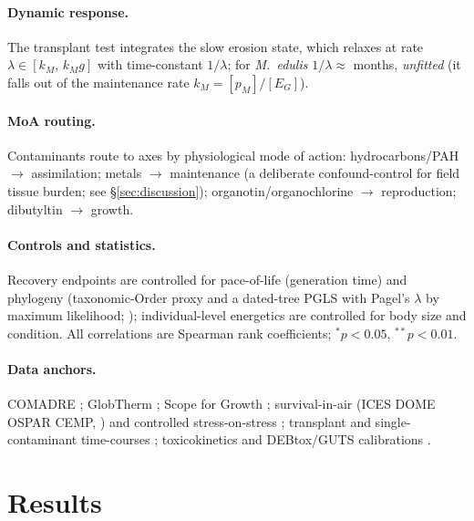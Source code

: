 \paragraph{Dynamic response.} The transplant test integrates the slow erosion state, which relaxes at
rate $\lambda\in[k_M,\,k_M g]$ with time-constant $1/\lambda$; for \emph{M.\ edulis}
$1/\lambda\approx$ months, \emph{unfitted} (it falls out of the maintenance rate $k_M=[p_M]/[E_G]$).

\paragraph{MoA routing.} Contaminants route to axes by physiological mode of action: hydrocarbons/PAH
$\to$ assimilation; metals $\to$ maintenance (a deliberate confound-control for field tissue burden;
see \S\ref{sec:discussion}); organotin/organochlorine $\to$ reproduction; dibutyltin $\to$ growth.

\paragraph{Controls and statistics.} Recovery endpoints are controlled for pace-of-life (generation
time) and phylogeny (taxonomic-Order proxy and a dated-tree PGLS with Pagel's $\lambda$ by maximum
likelihood; \citealp{pagel1999lambda}); individual-level energetics are controlled for body size and
condition. All correlations are Spearman rank coefficients; $^{*}p<0.05$, $^{**}p<0.01$.

\paragraph{Data anchors.} COMADRE \citep{salguero2016comadre}; GlobTherm \citep{bennett2018globtherm};
Scope for Growth \citep{widdows1995sfg,widdows2002sfg,albentosa2012sfg}; survival-in-air (ICES DOME
OSPAR CEMP, \citealp{icesdome2024}) and controlled stress-on-stress \citep{viarengo1995sos};
transplant and single-contaminant time-courses \citep{veldhuizen1991transplant,veldhuizen1991single};
toxicokinetics \citep{rubach2010tk} and DEBtox/GUTS calibrations
\citep{nyman2012guts,ashauer2016modelling,baas2015metabolic,jager2020debtox,jager2011guts}.

\section{Results}
\label{sec:results}

